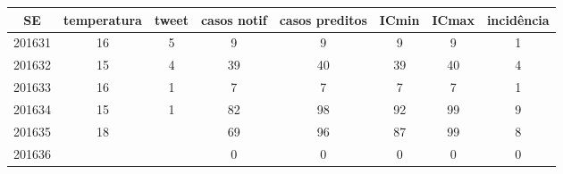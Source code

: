 \begin{tabular}{c|ccccccc}
  \hline
SE & temperatura & tweet & casos notif & casos preditos & ICmin & ICmax & incidência \\ 
  \hline
201631 & 16 & 5 & 9 & 9 & 9 & 9 & 1 \\ 
  201632 & 15 & 4 & 39 & 40 & 39 & 40 & 4 \\ 
  201633 & 16 & 1 & 7 & 7 & 7 & 7 & 1 \\ 
  201634 & 15 & 1 & 82 & 98 & 92 & 99 & 9 \\ 
  201635 & 18 &  & 69 & 96 & 87 & 99 & 8 \\ 
  201636 &  &  & 0 & 0 & 0 & 0 & 0 \\ 
   \hline
\end{tabular}

